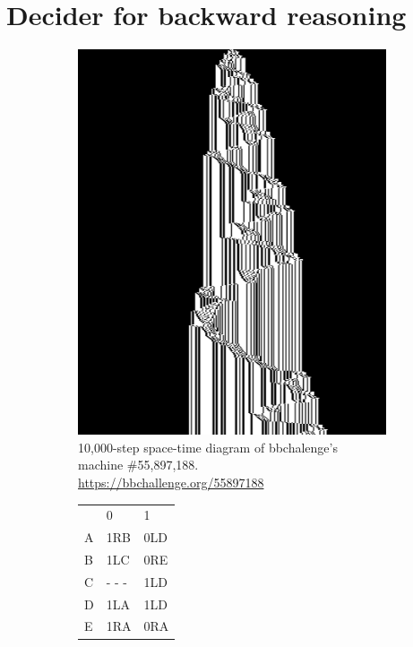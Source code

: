 \section{Decider for backward reasoning}\label{sec:backward-reasoning}

\begin{figure}
  \centering
  \begin{subfigure}[m]{0.45\textwidth}
      \centering
      \includegraphics[width=\textwidth]{space-time-diagrams/backward_reasoning_55897188.png}
      \caption{10,000-step space-time diagram of bbchalenge's machine \#55,897,188. \url{https://bbchallenge.org/55897188}}
      \label{fig:y equals x}
  \end{subfigure}
  \hfill
  \begin{subfigure}[m]{0.45\textwidth}
      \centering
      \begin{tabular}{lll}
        & 0   & 1   \\
      \textcolor{colorA}{A} & 1R\textcolor{colorB}{B} & 0LD \\
      \textcolor{colorB}{B} & 1L\textcolor{colorC}{C} & 0RE \\
      \textcolor{colorC}{C} & - - - & 1LD \\
      D & 1LA & 1LD \\
      E & 1RA & 0RA
      \end{tabular}
      

\end{subfigure}
\end{figure}
